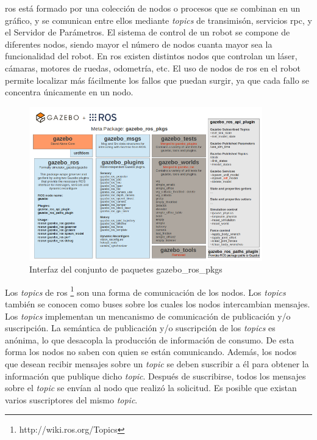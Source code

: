 \acrshort{ros} está formado por una colección de nodos o procesos que se combinan en un gráfico, y se comunican entre ellos mediante \textit{topics} de transimisón, servicios \acrshort{rpc}, y el Servidor de Parámetros. El sistema de control de un robot se compone de diferentes nodos, siendo mayor el número de nodos cuanta mayor sea la funcionalidad del robot. En \acrshort{ros} existen distintos nodos que controlan un láser, cámaras, motores de ruedas, odometría, etc. El uso de nodos de \acrshort{ros} en el robot permite localizar más fácilmente los fallos que puedan surgir, ya que cada fallo se concentra únicamente en un nodo.\\


\begin{figure}[H]
  \begin{center}
    \includegraphics[width=0.9\textwidth]{figures/Estado_arte/ros.png}
		\caption{Interfaz del conjunto de paquetes gazebo\_ros\_pkgs}
		\label{fig.ros}
		\end{center}
\end{figure}


Los \textit{topics} de \acrshort{ros} \footnote{http://wiki.ros.org/Topics} \cite{ros_book} son una forma de comunicación de los nodos. Los \textit{topics} también se conocen como buses sobre los cuales los nodos intercambian mensajes. Los \textit{topics} implementan un mencanismo de comunicación de publicación y/o suscripción. La semántica de publicación y/o suscripción de los \textit{topics} es anónima, lo que desacopla la producción de información de consumo. De esta forma los nodos no saben con quien se están comunicando. Además, los nodos que desean recibir mensajes sobre un \textit{topic} se deben suscribir a él para obtener la información que publique dicho \textit{topic}. Después de suscribirse, todos los mensajes sobre el \textit{topic} se envían al nodo que realizó la solicitud. Es posible que existan varios suscriptores del mismo \textit{topic}.\\

